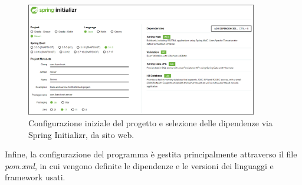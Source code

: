 \begin{figure}[H]
  \centering
  \includegraphics[width=0.9\textwidth]{img/Spring-Initializr.png}
  \caption{Configurazione iniziale del progetto e selezione delle dipendenze via Spring Initializr, da sito web.} 
  \label{fig:Spring-Initializr.png}
\end{figure}
Infine, la configurazione del programma è gestita principalmente attraverso il file \textit{pom.xml}, in cui vengono definite le dipendenze e le versioni dei linguaggi e framework usati.

